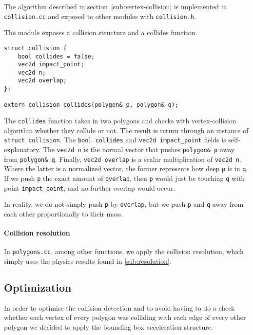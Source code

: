 The algorithm described in section~\ref{sub:vertex-collision} is implemented in
\texttt{collision.cc} and exposed to other modules with \texttt{collision.h}.

The module exposes a collision structure and a collides function.

\begin{lstlisting}[caption={Collision header file},label={lst:collision}]
struct collision {
    bool collides = false;
    vec2d impact_point;
    vec2d n;
    vec2d overlap;
};

extern collision collides(polygon& p, polygon& q);
\end{lstlisting}

The \lstinline{collides} function takes in two polygons and checks with
vertex-collision algorithm whether they collide or not. The result is return
through an instance of \lstinline{struct collision}. The \lstinline{bool collides}
and \lstinline{vec2d impact_point} fields is self-explanatory. The
\lstinline{vec2d n} is the normal vector that pushes \lstinline{polygon& p} away
from \lstinline{polygon& q}. Finally, \lstinline{vec2d overlap} is a scalar
multiplication of \lstinline{vec2d n}. Where the latter is a normalized vector,
the former represents how deep \lstinline{p} is in \lstinline{q}. If we push
\lstinline{p} the exact amount of \lstinline{overlap}, then \lstinline{p} would
just be touching \lstinline{q} with point \lstinline{impact_point}, and no
further overlap would occur.

In reality, we do not simply push \lstinline{p} by \lstinline{overlap}, but we
push \lstinline{p} and \lstinline{q} away from each other proportionally to
their mass.

\paragraph{Collision resolution} In \texttt{polygons.cc}, among other functions,
we apply the collision resolution, which simply uses the physics results found
in \ref{sub:resolution}.

\subsection{Optimization}

In order to optimise the collision detection and to avoid having to do a check
whether each vertex of every polygon was colliding with each edge of every other
polygon we decided to apply the bounding box acceleration structure.

